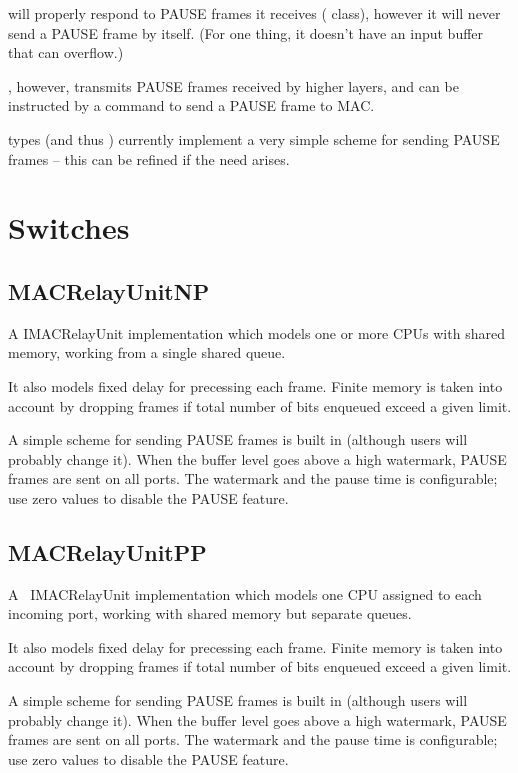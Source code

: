 will properly respond to PAUSE frames it receives
( class),
however it will never send a PAUSE frame by itself. (For one thing,
it doesn't have an input buffer that can overflow.)

, however, transmits PAUSE frames received by higher layers,
and  can be instructed by a command to send a PAUSE frame to MAC.

 types (and thus ) currently implement a very simple
scheme for sending PAUSE frames -- this can be refined if the need arises.


\section{Switches}

\subsection{MACRelayUnitNP}

A IMACRelayUnit implementation which models one or more CPUs
with shared memory, working from a single shared queue.

It also models fixed delay for precessing each frame.
Finite memory is taken into account by dropping frames if
total number of bits enqueued exceed a given limit.

A simple scheme for sending PAUSE frames is built in (although
users will probably change it). When the buffer level goes
above a high watermark, PAUSE frames are sent on all ports.
The watermark and the pause time is configurable; use zero
values to disable the PAUSE feature.

\subsection{MACRelayUnitPP}

A ~IMACRelayUnit implementation which models one CPU assigned to each
incoming port, working with shared memory but separate queues.

It also models fixed delay for precessing each frame.
Finite memory is taken into account by dropping frames if
total number of bits enqueued exceed a given limit.

A simple scheme for sending PAUSE frames is built in (although
users will probably change it). When the buffer level goes
above a high watermark, PAUSE frames are sent on all ports.
The watermark and the pause time is configurable; use zero
values to disable the PAUSE feature.

